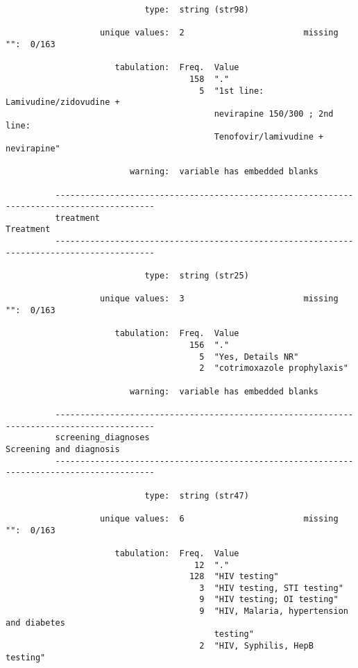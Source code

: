 \documentclass{article}
\begin{document}
\begin{verbatim}
                            type:  string (str98)
          
                   unique values:  2                        missing "":  0/163
          
                      tabulation:  Freq.  Value
                                     158  "."
                                       5  "1st line: Lamivudine/zidovudine +
                                          nevirapine 150/300 ; 2nd line:
                                          Tenofovir/lamivudine + nevirapine"
          
                         warning:  variable has embedded blanks
          
          ------------------------------------------------------------------------------------------
          treatment                                                                        Treatment
          ------------------------------------------------------------------------------------------
          
                            type:  string (str25)
          
                   unique values:  3                        missing "":  0/163
          
                      tabulation:  Freq.  Value
                                     156  "."
                                       5  "Yes, Details NR"
                                       2  "cotrimoxazole prophylaxis"
          
                         warning:  variable has embedded blanks
          
          ------------------------------------------------------------------------------------------
          screening_diagnoses                                                Screening and diagnosis
          ------------------------------------------------------------------------------------------
          
                            type:  string (str47)
          
                   unique values:  6                        missing "":  0/163
          
                      tabulation:  Freq.  Value
                                      12  "."
                                     128  "HIV testing"
                                       3  "HIV testing, STI testing"
                                       9  "HIV testing; OI testing"
                                       9  "HIV, Malaria, hypertension and diabetes
                                          testing"
                                       2  "HIV, Syphilis, HepB testing"
          

\end{verbatim}
\end{document}
